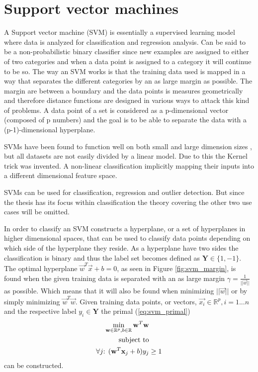 \section{Support vector machines}
\label{sec:mltheory:svm}

A Support vector machine (SVM) is essentially a supervised learning model where data is analyzed for classification and regression analysis. Can be said to be a non-probabilistic binary classifier since new examples are assigned to either of two categories and when a data point is assigned to a category it will continue to be so. The way an SVM works is that the training data used is mapped in a way that separates the different categories by an as large margin as possible. The margin are between a boundary and the data points is measures geometrically and therefore distance functions are designed in various ways to attack this kind of problems.
A data point of a set is considered as a p-dimensional vector (composed of p numbers) and the goal is to be able to separate the data with a (p-1)-dimensional hyperplane. 

SVMs have been found to function well on both small and large dimension sizes \cite{vert2005kernel}, but all datasets are not easily divided by a linear model.  Due to this the Kernel trick was invented. A non-linear classification implicitly mapping their inputs into a different dimensional feature space.

SVMs can be used for classification, regression and outlier detection. But since the thesis has its focus within classification the theory covering the other two use cases will be omitted. 

In order to classify an SVM constructs a hyperplane, or a set of hyperplanes in higher dimensional spaces, that can be used to classify data points depending on which side of the hyperplane they reside. As a hyperplane have two sides the classification is binary and thus the label set becomes defined as $\mathbf{Y} \in \{1,-1\}$. The optimal hyperplane $\vec{w}^T\vec{x}+b = 0$, as seen in Figure \ref{fig:svm_margin}, is found when the given training data is separated with an as large margin $\gamma = \frac{1}{||{\vec{w}||}}$ as possible. Which means that it will also be found when minimizing $||\vec{w}||$ or by simply minimizing $\vec{w}^T\vec{w}$. 
Given training data points, or vectors, $\vec{x_i} \in \mathbb{R}^p, i=1...n$ and the respective label $y_i \in \mathbf{Y}$ the primal (\ref{eq:svm_primal})
\begin{equation}
\label{eq:svm_primal}
\begin{split}
\min_{\vec{w}\in\mathbb{R}^p,b\in\mathbb{R}}{\vec{w}^T\vec{w}}& \\
\textnormal{subject to} & \\
\forall j\textnormal{: } (\vec{w}^T\vec{x}_j + b)y_j & \geq 1
\end{split}
\end{equation}
can be constructed.

